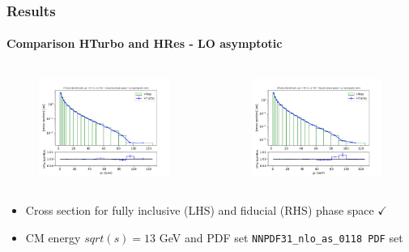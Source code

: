 \documentclass[aspectratio=43]{beamer}
\begin{document}
\begin{frame}
	
	\frametitle{Results}
	\framesubtitle{Comparison HTurbo and HRes - LO asymptotic}
	
	\footnotesize
	
	\begin{columns}
		
		
		\begin{figure}
			\includegraphics[width = 7cm]{plots/part3/chapter6/nlo-ct-1.png}
		\end{figure}
		
		
		\begin{figure}
			\includegraphics[width = 7cm]{plots/part3/chapter6/nlo-ct-fid-1.png}
		\end{figure}
		
	\end{columns}
	
	\begin{itemize}
		\item Cross section for fully inclusive (LHS) and fiducial (RHS) phase space {\color{darkgreen}$\checkmark$} 
		\item CM energy $sqrt(s) = 13$ GeV and PDF set \texttt{NNPDF31\_nlo\_as\_0118 PDF} set
	\end{itemize}

\end{frame}
\end{document}
